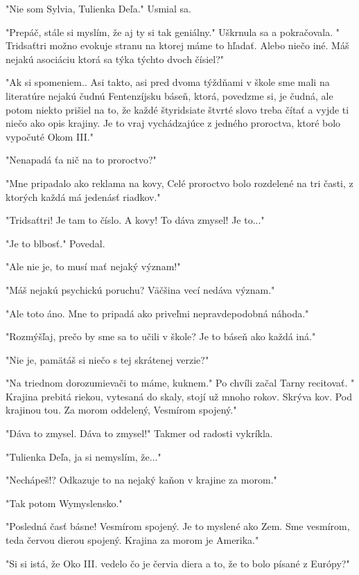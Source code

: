 \documentclass{book}
\begin{document}
"$ $Nie som Sylvia, Tulienka Deľa."$ $  Usmial sa.

"$ $Prepáč, stále si myslím, že aj ty si tak geniálny."$ $  Uškrnula sa a pokračovala. "$ $Tridsaťtri možno evokuje stranu na ktorej máme to hľadať. Alebo niečo iné. Máš nejakú asociáciu ktorá sa týka týchto dvoch čísiel?"$ $ 

"$ $Ak si spomeniem.. Asi takto, asi pred dvoma týždňami v škole sme mali na literatúre nejakú čudnú Fentenzíjsku báseň, ktorá, povedzme si, je čudná, ale potom niekto prišiel na to, že každé štyridsiate štvrté slovo treba čítať a vyjde ti niečo ako opis krajiny. Je to vraj vychádzajúce z jedného proroctva, ktoré bolo vypočuté Okom III."$ $ 

"$ $Nenapadá ťa nič na to proroctvo?"$ $ 

"$ $Mne pripadalo ako reklama na kovy, Celé proroctvo bolo rozdelené na tri časti, z ktorých každá má jedenásť riadkov."$ $ 

"$ $Tridsaťtri! Je tam to číslo. A kovy! To dáva zmysel! Je to..."$ $ 

"$ $Je to blbosť."$ $  Povedal.

"$ $Ale nie je, to musí mať nejaký význam!"$ $ 

"$ $Máš nejakú psychickú poruchu? Väčšina vecí nedáva význam."$ $ 

"$ $Ale toto áno. Mne to pripadá ako priveľmi nepravdepodobná náhoda."$ $ 

"$ $Rozmýšľaj, prečo by sme sa to učili v škole? Je to báseň ako každá iná."$ $ 

"$ $Nie je, pamätáš si niečo s tej skrátenej verzie?"$ $ 

"$ $Na triednom dorozumievači to máme, kuknem."$ $  Po chvíli začal Tarny recitovať. "$ $Krajina prebitá riekou, vytesaná do skaly, stojí už mnoho rokov. Skrýva kov. Pod krajinou tou. Za morom oddelený, Vesmírom spojený."$ $ 

"$ $Dáva to zmysel. Dáva to zmysel!"$ $  Takmer od radosti vykríkla.

"$ $Tulienka Deľa, ja si nemyslím, že..."$ $ 

"$ $Nechápeš!? Odkazuje to na nejaký kaňon v krajine za morom."$ $ 

"$ $Tak potom Wymyslensko."$ $ 

"$ $Posledná časť básne! Vesmírom spojený. Je to myslené ako Zem. Sme vesmírom, teda červou dierou spojený. Krajina za morom je Amerika."$ $ 

"$ $Si si istá, že Oko III. vedelo čo je červia diera a to, že to bolo písané z Európy?"$ $ 
\end{document}

